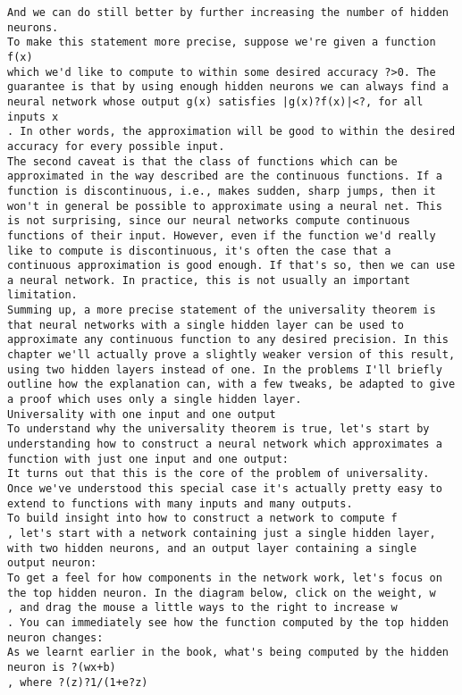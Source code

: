 \begin{lstlisting}
And we can do still better by further increasing the number of hidden neurons. 
To make this statement more precise, suppose we're given a function f(x)
which we'd like to compute to within some desired accuracy ?>0. The guarantee is that by using enough hidden neurons we can always find a neural network whose output g(x) satisfies |g(x)?f(x)|<?, for all inputs x
. In other words, the approximation will be good to within the desired accuracy for every possible input.
The second caveat is that the class of functions which can be approximated in the way described are the continuous functions. If a function is discontinuous, i.e., makes sudden, sharp jumps, then it won't in general be possible to approximate using a neural net. This is not surprising, since our neural networks compute continuous functions of their input. However, even if the function we'd really like to compute is discontinuous, it's often the case that a continuous approximation is good enough. If that's so, then we can use a neural network. In practice, this is not usually an important limitation.
Summing up, a more precise statement of the universality theorem is that neural networks with a single hidden layer can be used to approximate any continuous function to any desired precision. In this chapter we'll actually prove a slightly weaker version of this result, using two hidden layers instead of one. In the problems I'll briefly outline how the explanation can, with a few tweaks, be adapted to give a proof which uses only a single hidden layer. 
Universality with one input and one output
To understand why the universality theorem is true, let's start by understanding how to construct a neural network which approximates a function with just one input and one output:
It turns out that this is the core of the problem of universality. Once we've understood this special case it's actually pretty easy to extend to functions with many inputs and many outputs.
To build insight into how to construct a network to compute f
, let's start with a network containing just a single hidden layer, with two hidden neurons, and an output layer containing a single output neuron:
To get a feel for how components in the network work, let's focus on the top hidden neuron. In the diagram below, click on the weight, w
, and drag the mouse a little ways to the right to increase w
. You can immediately see how the function computed by the top hidden neuron changes:
As we learnt earlier in the book, what's being computed by the hidden neuron is ?(wx+b)
, where ?(z)?1/(1+e?z)

\end{lstlisting}
